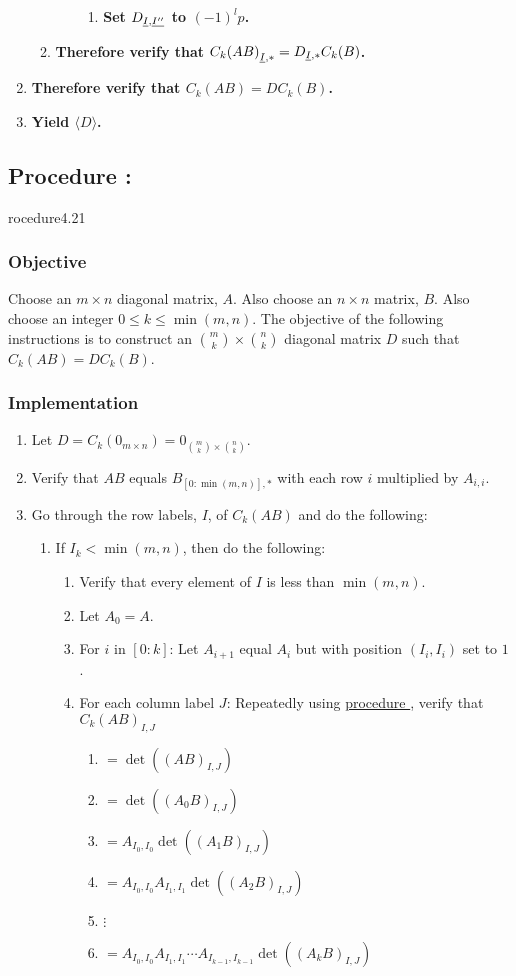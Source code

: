 \documentclass{article}
\newcommand{\ul}[1]{\protect\underline{#1}}
\newcounter{procedure}[part]
\newcommand{\procedure}[1]{\subsection*{Procedure \thepart:\theprocedure}\label{sec:procedure #1}\global\expandafter\edef\csname procedure#1\endcsname{\thepart:\theprocedure}\addtocounter{procedure}{1}}
\newcommand{\objective}{\subsubsection*{Objective}}
\newcommand{\implementation}{\subsubsection*{Implementation}}
\newcommand{\procedurehr}[1]{\hyperref[sec:procedure #1]{procedure \expandafter\csname procedure#1\endcsname}}
\begin{document}
\begin{multicols}{2}
\begin{enumerate}
\begin{enumerate}
\begin{enumerate}
\begin{enumerate}
								\item \textbf{Set $D_{\ul{I},\ul{I''}}$ to $(-1)^lp$.}
							\end{enumerate}
						\end{enumerate}
						\item \textbf{Therefore verify that ${C_k(AB)}_{\ul{I},*}=D_{\ul{I},*}C_k(B)$.}
					\end{enumerate}
					\item \textbf{Therefore verify that $C_k(AB)=DC_k(B)$.}
					\item \textbf{Yield $\langle D\rangle$.}
				\end{enumerate}
		\procedure{4.21}
			\objective
				Choose an $m\times n$ diagonal matrix, $A$. Also choose an $n\times n$ matrix, $B$. Also choose an integer $0\le k\le\min(m,n)$. The objective of the following instructions is to construct an $\binom{m}{k}\times\binom{n}{k}$ diagonal matrix $D$ such that $C_k(AB)=DC_k(B)$.
			\implementation
				\begin{enumerate}
					\item Let $D=C_k(0_{m\times n})=0_{\binom{m}{k}\times\binom{n}{k}}$.
					\item Verify that $AB$ equals $B_{[0:\min(m,n)],*}$ with each row $i$ multiplied by $A_{i,i}$.
					\item Go through the row labels, $I$, of $C_k(AB)$ and do the following:
					\begin{enumerate}
						\item If $I_k<\min(m,n)$, then do the following:
						\begin{enumerate}
							\item Verify that every element of $I$ is less than $\min(m,n)$.
							\item Let $A_0=A$.
							\item For $i$ in $[0:k]$: Let $A_{i+1}$ equal $A_{i}$ but with position $(I_i,I_i)$ set to $1$.
							\item For each column label $J$: Repeatedly using \procedurehr{4.12}, verify that ${C_k(AB)}_{I,J}$
							\begin{enumerate}
								\item $=\det((AB)_{I,J})$
								\item $=\det((A_0B)_{I,J})$
								\item $=A_{I_0,I_0}\det((A_1B)_{I,J})$
								\item $=A_{I_0,I_0}A_{I_1,I_1}\det((A_2B)_{I,J})$
								\item $\vdots$
								\item $=A_{I_0,I_0}A_{I_1,I_1}\cdots A_{I_{k-1},I_{k-1}}\det((A_kB)_{I,J})$

\end{enumerate}
\end{enumerate}
\end{enumerate}
\end{enumerate}
\end{multicols}
\end{document}

